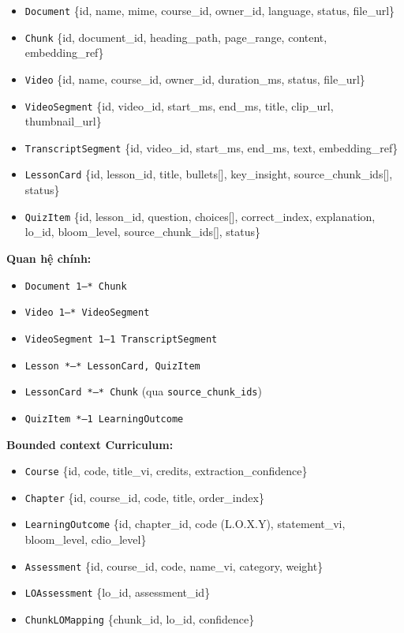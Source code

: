 \begin{itemize}
    \item \texttt{Document} \{id, name, mime, course\_id, owner\_id,
          language, status, file\_url\}
    \item \texttt{Chunk} \{id, document\_id, heading\_path, page\_range,
          content, embedding\_ref\}
    \item \texttt{Video} \{id, name, course\_id, owner\_id, duration\_ms,
          status, file\_url\}
    \item \texttt{VideoSegment} \{id, video\_id, start\_ms, end\_ms,
          title, clip\_url, thumbnail\_url\}
    \item \texttt{TranscriptSegment} \{id, video\_id, start\_ms, end\_ms,
          text, embedding\_ref\}
    \item \texttt{LessonCard} \{id, lesson\_id, title, bullets[],
          key\_insight, source\_chunk\_ids[], status\}
    \item \texttt{QuizItem} \{id, lesson\_id, question, choices[],
          correct\_index, explanation, lo\_id, bloom\_level,
          source\_chunk\_ids[], status\}
\end{itemize}

\textbf{Quan hệ chính:}
\begin{itemize}
    \item \texttt{Document 1---* Chunk}
    \item \texttt{Video 1---* VideoSegment}
    \item \texttt{VideoSegment 1---1 TranscriptSegment}
    \item \texttt{Lesson *---* LessonCard, QuizItem}
    \item \texttt{LessonCard *---* Chunk} (qua \texttt{source\_chunk\_ids})
    \item \texttt{QuizItem *---1 LearningOutcome}
\end{itemize}

\textbf{Bounded context Curriculum:}

\begin{itemize}
    \item \texttt{Course} \{id, code, title\_vi, credits,
          extraction\_confidence\}
    \item \texttt{Chapter} \{id, course\_id, code, title, order\_index\}
    \item \texttt{LearningOutcome} \{id, chapter\_id, code (L.O.X.Y),
          statement\_vi, bloom\_level, cdio\_level\}
    \item \texttt{Assessment} \{id, course\_id, code, name\_vi,
          category, weight\}
    \item \texttt{LOAssessment} \{lo\_id, assessment\_id\}
    \item \texttt{ChunkLOMapping} \{chunk\_id, lo\_id, confidence\}
\end{itemize}


